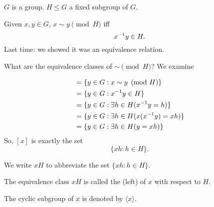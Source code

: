 \documentclass[notes.tex]{subfiles}
\begin{document}


$G$ is a group. $H \le G$ a fixed subgroup of $G$.

Given $x, y\in G$, $x\sim y \pmod H$ iff \[
	{x}^{-1}y\in H.
\]
Last time: we showed it was an equivalence relation.

What are the equivalence classes of $\sim\pmod H$?
We examine

\begin{align*}
	[x] &= \{y\in G: x\sim y\pmod H\}\\
	&= \{y\in G : \inv xy\in H\}\\
	&= \{y\in G : \exists h \in H (\inv x y = h)\}\\
	&= \{y\in G : \exists h\in H (x(\inv xy)=xh)\}\\
	&= \{y\in G : \exists h \in H (y = xh)\}
\end{align*}
So, $[x]$ is exactly the set \[
	\{xh:h\in H\}.
\]
\begin{notation}
	We write $xH$ to abbreviate the set $\{xh:h\in H\}$.
\end{notation}

\begin{definition}
	The equivalence class $xH$ is called the (left)  of $x$ with respect to $H$.
\end{definition}

\begin{notation}
	The cyclic subgroup of $x$ is denoted by $\langle x\rangle$.
\end{notation}
\end{document}
